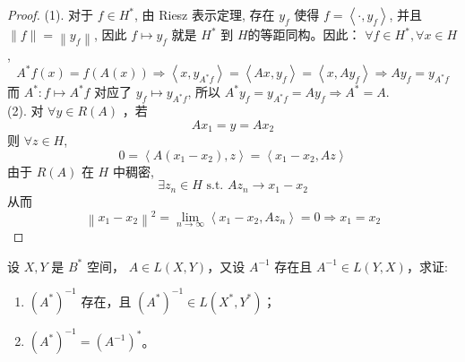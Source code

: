 \documentclass[lang=cn,newtx,10pt,scheme=chinese,thmcnt=chapter]{elegantbook}
\begin{document}
\begin{proof}
(1). 对于 $f \in H^*$, 由 Riesz 表示定理, 存在 $y_f$ 使得 $f=\left\langle\cdot, y_f\right\rangle$, 并且 $\|f\|=\left\|y_f\right\|$, 因此 $f \mapsto y_f$ 就是 $H^*$ 到 $H$的等距同构。因此： $\forall f \in H^*, \forall x \in H$,
\begin{equation*}
A^* f(x)=f(A(x)) \Rightarrow\left\langle x, y_{A^* f}\right\rangle=\left\langle A x, y_f\right\rangle=\left\langle x, A y_f\right\rangle \Rightarrow A y_f=y_{A^* f}
\end{equation*}
而 $A^*: f \mapsto A^* f$ 对应了 $y_f \mapsto y_{A^* f}$, 所以 $A^* y_f=y_{A^* f}=A y_f \Rightarrow A^*=A$.\\
(2). 对 $\forall y \in R(A)$ ，若
\begin{equation*}
A x_1=y=A x_2
\end{equation*}
则 $\forall z \in H$,
\begin{equation*}
0=\left\langle A\left(x_1-x_2\right), z\right\rangle=\left\langle x_1-x_2, A z\right\rangle
\end{equation*}
由于 $R(A)$ 在 $H$ 中稠密,
\begin{equation*}
\exists z_n \in H \text { s.t. } A z_n \rightarrow x_1-x_2
\end{equation*}
从而
\begin{equation*}
\left\|x_1-x_2\right\|^2=\lim _{n \rightarrow \infty}\left\langle x_1-x_2, A z_n\right\rangle=0 \Rightarrow x_1=x_2
\end{equation*}
\end{proof}
\begin{problem}
  设 ${X}, {Y}$ 是 ${B}^*$ 空间， $A \in {L}({X}, {Y})$，又设 $A^{-1}$ 存在且 $A^{-1} \in {L}({Y}, {X})$，求证:
  \begin{enumerate}
    \item $\left(A^*\right)^{-1}$ 存在，且 $\left(A^*\right)^{-1} \in {L}({X}^*, {Y}^*)$；
    \item $\left(A^*\right)^{-1} = \left(A^{-1}\right)^*$。
  \end{enumerate}
\end{problem}
\end{document}
